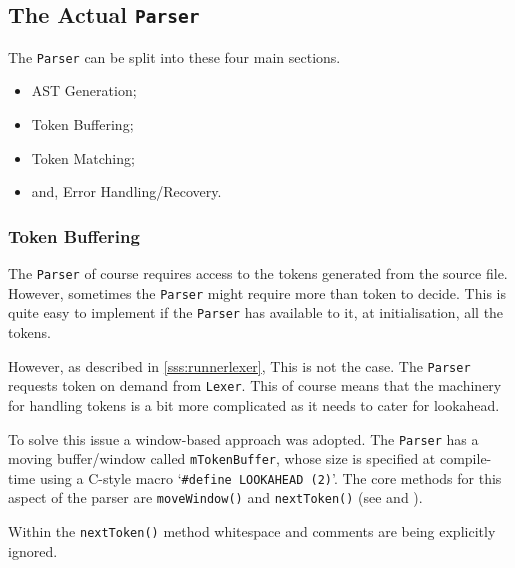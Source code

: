 \subsection{The Actual \texttt{Parser}}

The \texttt{Parser} can be split into these four main sections.

\begin{itemize}
    \item AST Generation;
    \item Token Buffering;
    \item Token Matching;
    \item and, Error Handling/Recovery.
\end{itemize}

\subsubsection{Token Buffering}

The \texttt{Parser} of course requires access to the tokens
generated from the source file. However, sometimes the
\texttt{Parser} might require more than token to decide. This is
quite easy to implement if the \texttt{Parser} has available to
it, at initialisation, all the tokens.

However, as described in \ref{sss:runnerlexer}, This is not the
case. The \texttt{Parser} requests token on demand from
\texttt{Lexer}. This of course means that the machinery for
handling tokens is a bit more complicated as it needs to cater
for lookahead.

To solve this issue a window-based approach was adopted. The
\texttt{Parser} has a moving buffer/window called
\texttt{mTokenBuffer}, whose size is specified at compile-time
using a C-style macro `\texttt{\#define LOOKAHEAD (2)}'. The
core methods for this aspect of the parser are
\texttt{moveWindow()} and \texttt{nextToken()} (see
 and ).



\pagebreak



\begin{note}
Within the \texttt{nextToken()} method whitespace and comments
are being explicitly ignored.
\end{note}

